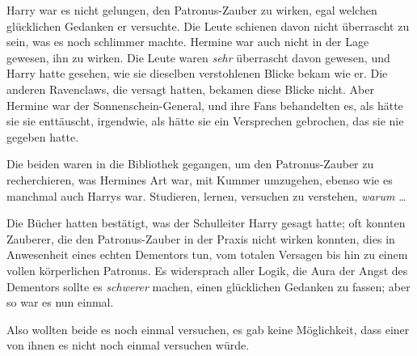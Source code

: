 Harry war es nicht gelungen, den Patronus-Zauber zu wirken, egal welchen glücklichen Gedanken er versuchte. Die Leute schienen davon nicht überrascht zu sein, was es noch schlimmer machte. Hermine war auch nicht in der Lage gewesen, ihn zu wirken. Die Leute waren \emph{sehr} überrascht davon gewesen, und Harry hatte gesehen, wie sie dieselben verstohlenen Blicke bekam wie er. Die anderen Ravenclaws, die versagt hatten, bekamen diese Blicke nicht. Aber Hermine war der Sonnenschein-General, und ihre Fans behandelten es, als hätte sie sie enttäuscht, irgendwie, als hätte sie ein Versprechen gebrochen, das sie nie gegeben hatte.

Die beiden waren in die Bibliothek gegangen, um den Patronus-Zauber zu recherchieren, was Hermines Art war, mit Kummer umzugehen, ebenso wie es manchmal auch Harrys war. Studieren, lernen, versuchen zu verstehen, \emph{warum} …

Die Bücher hatten bestätigt, was der Schulleiter Harry gesagt hatte; oft konnten Zauberer, die den Patronus-Zauber in der Praxis nicht wirken konnten, dies in Anwesenheit eines echten Dementors tun, vom totalen Versagen bis hin zu einem vollen körperlichen Patronus. Es widersprach aller Logik, die Aura der Angst des Dementors sollte es \emph{schwerer} machen, einen glücklichen Gedanken zu fassen; aber so war es nun einmal.

Also wollten beide es noch einmal versuchen, es gab keine Möglichkeit, dass einer von ihnen es nicht noch einmal versuchen würde.

